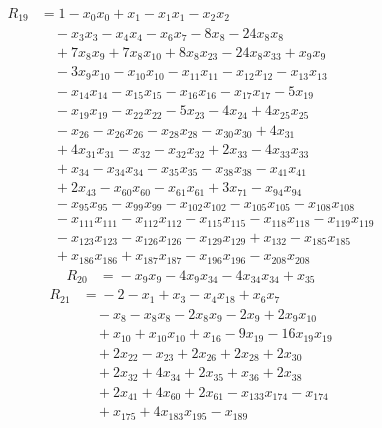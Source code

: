\begin{align*}
R_{19}&={}1 -x_{0}x_{0} +x_{1} -x_{1}x_{1} -x_{2}x_{2}\\
&\quad{}-x_{3}x_{3} -x_{4}x_{4} -x_{6}x_{7} -8x_{8} -24x_{8}x_{8}\\
&\quad{}+7x_{8}x_{9} +7x_{8}x_{10} +8x_{8}x_{23} -24x_{8}x_{33} +x_{9}x_{9}\\
&\quad{}-3x_{9}x_{10} -x_{10}x_{10} -x_{11}x_{11} -x_{12}x_{12} -x_{13}x_{13}\\
&\quad{}-x_{14}x_{14} -x_{15}x_{15} -x_{16}x_{16} -x_{17}x_{17} -5x_{19}\\
&\quad{}-x_{19}x_{19} -x_{22}x_{22} -5x_{23} -4x_{24} +4x_{25}x_{25}\\
&\quad{}-x_{26} -x_{26}x_{26} -x_{28}x_{28} -x_{30}x_{30} +4x_{31}\\
&\quad{}+4x_{31}x_{31} -x_{32} -x_{32}x_{32} +2x_{33} -4x_{33}x_{33}\\
&\quad{}+x_{34} -x_{34}x_{34} -x_{35}x_{35} -x_{38}x_{38} -x_{41}x_{41}\\
&\quad{}+2x_{43} -x_{60}x_{60} -x_{61}x_{61} +3x_{71} -x_{94}x_{94}\\
&\quad{}-x_{95}x_{95} -x_{99}x_{99} -x_{102}x_{102} -x_{105}x_{105} -x_{108}x_{108}\\
&\quad{}-x_{111}x_{111} -x_{112}x_{112} -x_{115}x_{115} -x_{118}x_{118} -x_{119}x_{119}\\
&\quad{}-x_{123}x_{123} -x_{126}x_{126} -x_{129}x_{129} +x_{132} -x_{185}x_{185}\\
&\quad{}+x_{186}x_{186} +x_{187}x_{187} -x_{196}x_{196} -x_{208}x_{208}
\end{align*}
\begin{align*}
R_{20}&={}-x_{9}x_{9} -4x_{9}x_{34} -4x_{34}x_{34} +x_{35}
\end{align*}
\begin{align*}
R_{21}&={}-2 -x_{1} +x_{3} -x_{4}x_{18} +x_{6}x_{7}\\
&\quad{}-x_{8} -x_{8}x_{8} -2x_{8}x_{9} -2x_{9} +2x_{9}x_{10}\\
&\quad{}+x_{10} +x_{10}x_{10} +x_{16} -9x_{19} -16x_{19}x_{19}\\
&\quad{}+2x_{22} -x_{23} +2x_{26} +2x_{28} +2x_{30}\\
&\quad{}+2x_{32} +4x_{34} +2x_{35} +x_{36} +2x_{38}\\
&\quad{}+2x_{41} +4x_{60} +2x_{61} -x_{133}x_{174} -x_{174}\\
&\quad{}+x_{175} +4x_{183}x_{195} -x_{189}
\end{align*}
